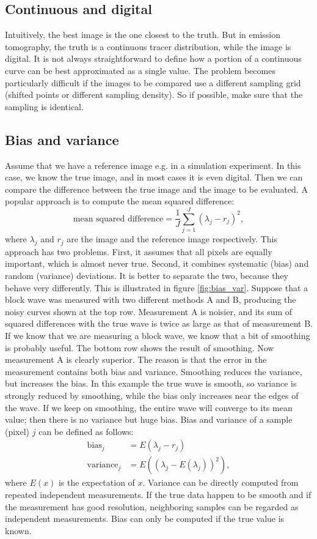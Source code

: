 \documentclass[11pt,oneside]{book}
\begin{document}
\subsection{Continuous and digital}
Intuitively, the best image is the one closest to the truth. But in emission
tomography, the truth is a continuous tracer distribution, while the image is
digital. It is not always straightforward to define how a portion of a
continuous curve can be best approximated as a single value. The problem
becomes particularly difficult if the images to be compared use a different
sampling grid (shifted points or different sampling density). So if possible,
make sure that the sampling is identical.

\subsection{Bias and variance}
Assume that we have a reference image e.g. in a simulation experiment. In
this case, we know the true image, and in most cases it is even digital. Then
we can compare the difference between the true image and the image to be
evaluated. A popular approach is to compute the mean squared difference:
\begin{equation}
  \mbox{mean squared difference} = \frac{1}{J} \sum_{j=1}^J (\lambda_j - r_j)^2,
\end{equation}
where $\lambda_j$ and $r_j$ are the image and the reference image
respectively.  This approach has two problems. First, it assumes that
all pixels are equally important, which is almost never true. Second,
it combines systematic (bias) and random (variance) deviations. It is
better to separate the two, because they behave very differently. This
is illustrated in figure \ref{fig:bias_var}. Suppose that a block wave
was measured with two different methods A and B, producing the noisy
curves shown at the top row. Measurement A is noisier, and its sum of
squared differences with the true wave is twice as large as that of
measurement B. If we know that we are measuring a block wave, we know
that a bit of smoothing is probably useful. The bottom row shows the
result of smoothing. Now measurement A is clearly superior. The reason
is that the error in the measurement contains both bias and
variance. Smoothing reduces the variance, but increases the bias. In
this example the true wave is smooth, so variance is strongly reduced
by smoothing, while the bias only increases near the edges of the
wave.  If we keep on smoothing, the entire wave will converge to its
mean value; then there is no variance but huge bias. Bias and variance
of a sample (pixel) $j$ can be defined as follows:
\begin{align}
  \mbox{bias}_j     &= E(\lambda_j - r_j)\\
  \mbox{variance}_j &= E\left((\lambda_j - E(\lambda_j))^2 \right),
\end{align}
where $E(x)$ is the expectation of $x$. Variance can be directly computed from
repeated independent measurements. If the true data happen to be smooth and if
the measurement has good resolution, neighboring samples can be regarded as
independent measurements. Bias can only be computed if the true value is known.
\end{document}
